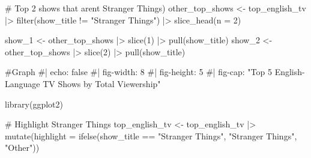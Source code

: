 \documentclass[
  12pt,
  letterpaper,
  DIV=11,
  numbers=noendperiod]{scrartcl}
\newenvironment{Shaded}{\begin{snugshade}}{\end{snugshade}}
\newcommand{\AttributeTok}[1]{\textcolor[rgb]{0.40,0.45,0.13}{#1}}
\newcommand{\CommentTok}[1]{\textcolor[rgb]{0.37,0.37,0.37}{#1}}
\newcommand{\DecValTok}[1]{\textcolor[rgb]{0.68,0.00,0.00}{#1}}
\newcommand{\FunctionTok}[1]{\textcolor[rgb]{0.28,0.35,0.67}{#1}}
\newcommand{\NormalTok}[1]{\textcolor[rgb]{0.00,0.23,0.31}{#1}}
\newcommand{\OtherTok}[1]{\textcolor[rgb]{0.00,0.23,0.31}{#1}}
\newcommand{\SpecialCharTok}[1]{\textcolor[rgb]{0.37,0.37,0.37}{#1}}
\newcommand{\StringTok}[1]{\textcolor[rgb]{0.13,0.47,0.30}{#1}}
\begin{document}
\begin{Shaded}
\begin{Highlighting}[]
\CommentTok{\# Top 2 shows that aren\textquotesingle{}t Stranger Things)}
\NormalTok{other\_top\_shows }\OtherTok{\textless{}{-}}\NormalTok{ top\_english\_tv }\SpecialCharTok{|\textgreater{}}
  \FunctionTok{filter}\NormalTok{(show\_title }\SpecialCharTok{!=} \StringTok{"Stranger Things"}\NormalTok{) }\SpecialCharTok{|\textgreater{}}
  \FunctionTok{slice\_head}\NormalTok{(}\AttributeTok{n =} \DecValTok{2}\NormalTok{)}

\NormalTok{show\_1 }\OtherTok{\textless{}{-}}\NormalTok{ other\_top\_shows }\SpecialCharTok{|\textgreater{}} \FunctionTok{slice}\NormalTok{(}\DecValTok{1}\NormalTok{) }\SpecialCharTok{|\textgreater{}} \FunctionTok{pull}\NormalTok{(show\_title)}
\NormalTok{show\_2 }\OtherTok{\textless{}{-}}\NormalTok{ other\_top\_shows }\SpecialCharTok{|\textgreater{}} \FunctionTok{slice}\NormalTok{(}\DecValTok{2}\NormalTok{) }\SpecialCharTok{|\textgreater{}} \FunctionTok{pull}\NormalTok{(show\_title)}

\CommentTok{\#Graph}
\CommentTok{\#| echo: false}
\CommentTok{\#| fig{-}width: 8}
\CommentTok{\#| fig{-}height: 5}
\CommentTok{\#| fig{-}cap: "Top 5 English{-}Language TV Shows by Total Viewership"}

\FunctionTok{library}\NormalTok{(ggplot2)}

\CommentTok{\# Highlight Stranger Things}
\NormalTok{top\_english\_tv }\OtherTok{\textless{}{-}}\NormalTok{ top\_english\_tv }\SpecialCharTok{|\textgreater{}}
  \FunctionTok{mutate}\NormalTok{(}\AttributeTok{highlight =} \FunctionTok{ifelse}\NormalTok{(show\_title }\SpecialCharTok{==} \StringTok{"Stranger Things"}\NormalTok{, }\StringTok{"Stranger Things"}\NormalTok{, }\StringTok{"Other"}\NormalTok{))}


\end{Highlighting}
\end{Shaded}
\end{document}
